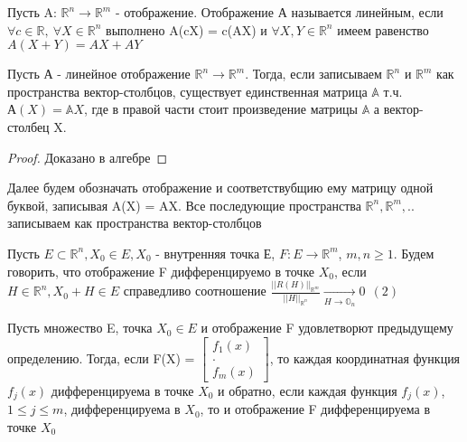 \begin{definition}
Пусть A: $\mathbb{R}^n \to \mathbb{R}^m$ - отображение. Отображение А называется линейным, если $\forall c \in \mathbb{R}, \ \forall X \in \mathbb{R}^n$ выполнено A(cX) = c(AX) и $\forall X,Y \in \mathbb{R}^n$ имеем равенство $A(X+Y) = AX+ AY$
\end{definition}
\begin{assertion}
	Пусть А - линейное отображение $\mathbb{R}^n \to \mathbb{R}^m$. Тогда, если записываем $\mathbb{R}^n$ и $\mathbb{R}^m$ как пространства вектор-столбцов, существует единственная матрица $\mathbb{A}$ т.ч. $А(X) = \mathbb{A}X$, где в правой части стоит произведение матрицы $\mathbb{A}$ а вектор-столбец X.
\end{assertion}
\begin{proof}
Доказано в алгебре
\end{proof}
Далее будем обозначать отображение и соответствубщию ему матрицу одной буквой, записывая A(X) = AX. Все последующие пространства $\mathbb{R}^n, \mathbb{R}^m,..$ записываем как пространства вектор-столбцов
\begin{definition}
	 Пусть $E \subset \mathbb{R}^n, X_0 \in E, X_0$ - внутренняя точка Е, $F: E \to \mathbb{R}^m$, $m,n \geq 1.$ Будем говорить, что отображение F дифференцируемо в точке $X_0$, если $H \in \mathbb{R}^n,X_0 + H \in E$ справедливо соотношение $\frac{||R(H)||_{\mathbb{R}^m}}{||H||_{\mathbb{R}^n}} \underset{H \to \mathbb{O}_n}{\to} 0 \ \ (2)$
\end{definition}
\begin{assertion}
	Пусть множество E, точка $X_0 \in E$  и отображение F удовлетворют предыдущему определению. Тогда, если F(X) = $\begin{bmatrix} f_1(x)\\ .\\ f_m(x) \end{bmatrix}$, то каждая координатная функция $f_j(x)$ дифференцируема в точке $X_0$ и обратно, если каждая функция $f_j(x)$, $1 \leq j \leq m$, дифференцируема в $X_0$, то и отображение F дифференцируема в точке $X_0$
\end{assertion}
